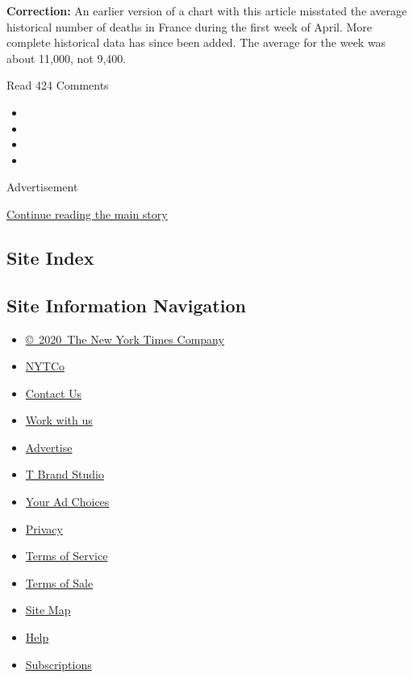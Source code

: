 \textbf{Correction:} An earlier version of a chart with this article
misstated the average historical number of deaths in France during the
first week of April. More complete historical data has since been added.
The average for the week was about 11,000, not 9,400.

Read 424 Comments

\begin{itemize}
\item
\item
\item
\item
\end{itemize}

Advertisement

\protect\hyperlink{after-bottom}{Continue reading the main story}

\hypertarget{site-index}{%
\subsection{Site Index}\label{site-index}}

\hypertarget{site-information-navigation}{%
\subsection{Site Information
Navigation}\label{site-information-navigation}}

\begin{itemize}
\tightlist
\item
  \href{https://help.nytimes.com/hc/en-us/articles/115014792127-Copyright-notice}{©~2020~The
  New York Times Company}
\end{itemize}

\begin{itemize}
\tightlist
\item
  \href{https://www.nytco.com/}{NYTCo}
\item
  \href{https://help.nytimes.com/hc/en-us/articles/115015385887-Contact-Us}{Contact
  Us}
\item
  \href{https://www.nytco.com/careers/}{Work with us}
\item
  \href{https://nytmediakit.com/}{Advertise}
\item
  \href{http://www.tbrandstudio.com/}{T Brand Studio}
\item
  \href{https://www.nytimes.com/privacy/cookie-policy\#how-do-i-manage-trackers}{Your
  Ad Choices}
\item
  \href{https://www.nytimes.com/privacy}{Privacy}
\item
  \href{https://help.nytimes.com/hc/en-us/articles/115014893428-Terms-of-service}{Terms
  of Service}
\item
  \href{https://help.nytimes.com/hc/en-us/articles/115014893968-Terms-of-sale}{Terms
  of Sale}
\item
  \href{https://spiderbites.nytimes.com}{Site Map}
\item
  \href{https://help.nytimes.com/hc/en-us}{Help}
\item
  \href{https://www.nytimes.com/subscription?campaignId=37WXW}{Subscriptions}
\end{itemize}
